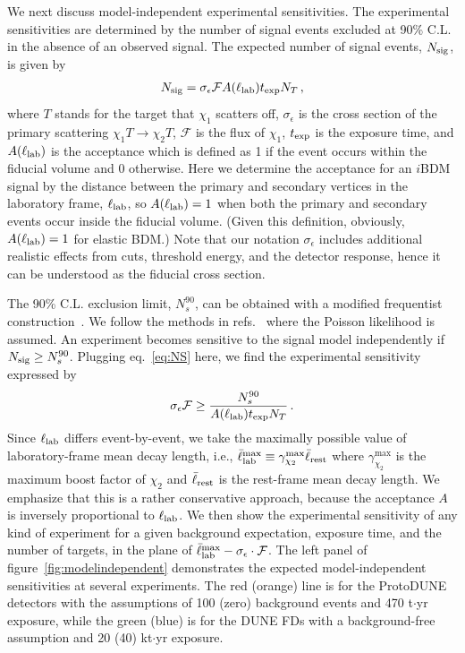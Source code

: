 We next discuss model-independent experimental sensitivities. 
The experimental sensitivities are determined by the number of signal events excluded at 90\% C.L. in the absence of an observed signal.
The expected number of signal events, $N_{\rm sig}$, is given by
\begin{align}
N_{\rm sig} = \sigma_\epsilon \mathcal F A(\ell_{\rm lab}) t_{\rm exp} N_T\,,
\label{eq:NS}
\end{align}
where $T$ stands for the target that $\chi_1$ scatters off, $\sigma_\epsilon$ is the cross section of the primary scattering $\chi_1 T \to \chi_2 T$, $\mathcal F$ is the flux of $\chi_1$, $t_{\rm exp}$ is the exposure time, and $A(\ell_{\rm lab})$ is the acceptance which is defined as 1 if the event occurs within the fiducial volume and 0 otherwise.
Here we determine the acceptance for an $i$BDM signal by the distance between the primary and secondary vertices in the laboratory frame, $\ell_{\rm lab}$, so $A(\ell_{\rm lab}) = 1$ when both the primary and secondary events occur inside the fiducial volume. (Given this definition, obviously, $A(\ell_{\rm lab}) = 1$ for elastic BDM.)
Note that our notation $\sigma_\epsilon$ includes additional realistic effects from cuts, threshold energy, and the detector response, hence it can be understood as the fiducial cross section.

The 90\% C.L. exclusion limit, $N_s^{90}$, can be obtained with a modified frequentist construction~\cite{cls1,cls2}. We follow the methods in refs.~\cite{Dermisek:2013cxa,Dermisek:2014qca,Dermisek:2016via} where the Poisson likelihood is assumed. 
An experiment becomes sensitive to the signal model independently if $N_{\rm sig} \ge N_s^{90}$.
Plugging eq.~\eqref{eq:NS} here, we find the experimental sensitivity expressed by %
\begin{align}
\sigma_\epsilon \mathcal F \ge \frac{N_s^{90}}{A(\ell_{\rm lab}) t_{\rm exp} N_T}\,. 
\label{eq:MIsensitivity}
\end{align}
Since $\ell_{\rm lab}$ differs event-by-event, we take the maximally possible value of laboratory-frame mean decay length, i.e., $\bar{\ell}_{\rm lab}^{\rm max} \equiv \gamma_{\chi_2}^{\max} \bar{\ell}_{\rm rest}$ where $\gamma_{\chi_2}^{\max}$ is the maximum boost factor of $\chi_2$ and $\bar{\ell}_{\rm rest}$ is the rest-frame mean decay length. 
We emphasize that this is a rather conservative approach, because the acceptance $A$ is inversely proportional to $\ell_{\rm lab}$.
We then show the experimental sensitivity of any kind of experiment for a given background expectation, exposure time, and the number of targets, in the plane of $\bar{\ell}_{\rm lab}^{\rm max} - \sigma_\epsilon \cdot \mathcal F$. 
The left panel of figure~\ref{fig:modelindependent} demonstrates the expected model-independent sensitivities at several experiments. 
The red (orange) line is for the ProtoDUNE detectors with the assumptions of 100 (zero) background events and 470 t$\cdot$yr exposure, while the green (blue) is for the DUNE FDs with a background-free assumption and 20 (40) kt$\cdot$yr exposure.

